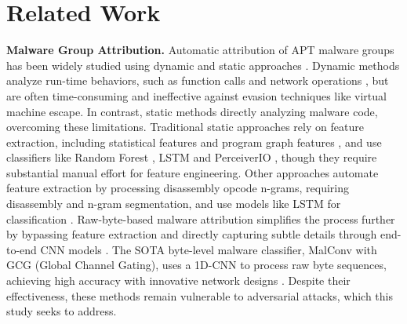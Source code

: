 \section{Related Work}
\label{sec2}

\textbf{Malware Group Attribution. } Automatic attribution of APT malware groups has been widely studied using dynamic and static approaches \cite{ref2}. Dynamic methods analyze run-time behaviors, such as function calls \cite{ref9} and network operations \cite{ref8}, but are often time-consuming and ineffective against evasion techniques like virtual machine escape. In contrast, static methods directly analyzing malware code, overcoming these limitations. Traditional static approaches rely on feature extraction, including statistical features \cite{ref15} and program graph features \cite{ref17}, and use classifiers like Random Forest \cite{ref15}, LSTM \cite{ref17} and PerceiverIO \cite{ref61}, though they require substantial manual effort for feature engineering. Other approaches automate feature extraction by processing disassembly opcode n-grams, requiring disassembly and n-gram segmentation, and use models like LSTM for classification \cite{ref18}. Raw-byte-based malware attribution simplifies the process further by bypassing feature extraction and directly capturing subtle details through end-to-end CNN models \cite{ref24,ref58}. The SOTA byte-level malware classifier, MalConv with GCG (Global Channel Gating), uses a 1D-CNN to process raw byte sequences, achieving high accuracy with innovative network designs \cite{ref24}. Despite their effectiveness, these methods remain vulnerable to adversarial attacks, which this study seeks to address.



